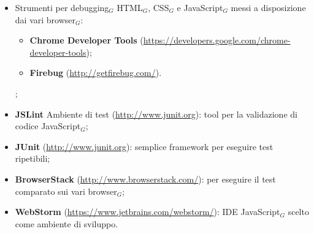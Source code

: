\begin{itemize}
	\item Strumenti per debugging$_G$ HTML$_G$, CSS$_G$ e JavaScript$_G$ messi a disposizione dai vari browser$_G$:
	    \begin{itemize}
	    	\item \textbf{Chrome Developer Tools} (\href{https://developers.google.com/chrome-developer-tools}
	    	{https://developers.google.com/chrome-developer-tools});
	    	\item \textbf{Firebug}
	    	(\href{http://getfirebug.com/}{http://getfirebug.com/}).
	    \end{itemize};
	\item \textbf{JSLint} Ambiente di test (\href{http://www.junit.org}{http://www.junit.org}): tool per la validazione di codice JavaScript$_G$;
	\item \textbf{JUnit} (\href{http://www.junit.org}{http://www.junit.org}): semplice framework per eseguire test ripetibili;
	\item \textbf{BrowserStack} (\href{http://www.browserstack.com/}{http://www.browserstack.com/}):  per eseguire il test comparato sui vari browser$_G$;
	\item \textbf{WebStorm} (\href{https://www.jetbrains.com/webstorm/}{https://www.jetbrains.com/webstorm/}): IDE JavaScript$_G$ scelto come ambiente di sviluppo.
\end{itemize}

